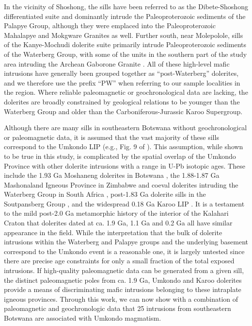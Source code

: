 \documentclass[11pt,letterpaper]{article}
\begin{document}
In the vicinity of Shoshong, the sills have been referred to as the Dibete-Shoshong differentiated suite \citep{Carney1994a} and dominantly intrude the Paleoproterozoic sediments of the Palapye Group, although they were emplaced into the Paleoproterozoic Mahalapye and Mokgware Granites as well. Further south, near Molepolole, sills of the Kanye-Mochudi dolerite suite primarily intrude Paleoproterozoic sediments of the Waterberg Group, with some of the units in the southern part of the study area intruding the Archean Gaborone Granite \citep{Carney1994a}. All of these high-level mafic intrusions have generally been grouped together as ``post-Waterberg'' dolerites, and we therefore use the prefix ``PW'' when referring to our sample localities in the region. Where reliable paleomagnetic or geochronological data are lacking, the dolerites are broadly constrained by geological relations to be younger than the Waterberg Group and older than the Carboniferous-Jurassic Karoo Supergroup. 

Although there are many sills in southeastern Botswana without geochronological or paleomagnetic data, it is assumed that the vast majority of these sills correspond to the Umkondo LIP (e.g., Fig. 9 of \citealp{Hanson2006a}). This assumption, while shown to be true in this study, is complicated by the spatial overlap of the Umkondo Province with other dolerite intrusions with a range in U-Pb isotopic ages. These include the 1.93 Ga Moshaneng dolerites in Botswana \citep{Hanson2004b}, the 1.88-1.87 Ga Mashonaland Igneous Province in Zimbabwe and coeval dolerites intruding the Waterberg Group in South Africa \citep{Hanson2004b,Hanson2011b,Soderlund2010a}, post-1.83 Ga dolerite sills in the Soutpansberg Group \citep{Brandl1981a,Brandl1985a,Geng2014a}, and the widespread 0.18 Ga Karoo LIP \citep{Sell2014a}. It is a testament to the mild post-2.0 Ga metamorphic history of the interior of the Kalahari Craton that dolerites dated at ca. 1.9 Ga, 1.1 Ga and 0.2 Ga all have similar appearance in the field. While the interpretation that the bulk of dolerite intrusions within the Waterberg and Palapye groups and the underlying basement correspond to the Umkondo event is a reasonable one, it is largely untested since there are precise age constraints for only a small fraction of the total exposed intrusions. If high-quality paleomagnetic data can be generated from a given sill, the distinct paleomagnetic poles from ca. 1.9 Ga, Umkondo and Karoo dolerites provide a means of discriminating mafic intrusions belonging to these intraplate igneous provinces. Through this work, we can now show with a combination of paleomagnetic and geochronologic data that 25 intrusions from southeastern Botswana are associated with Umkondo magmatism.
\end{document}
